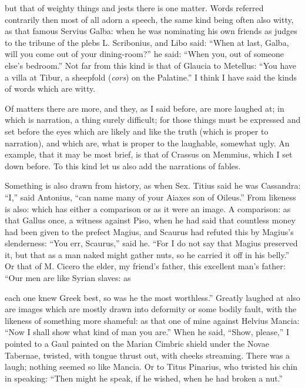  but that of weighty things and jests there is one matter. Words referred contrarily then most of all adorn a speech, the same kind being often also witty, as that famous Servius Galba: when he was nominating his own friends as judges to the tribune of the plebs L. Scribonius, and Libo said: ``When at last, Galba, will you come out of your dining-room?'' he said: ``When you, out of someone else's bedroom.'' Not far from this kind is that of Glaucia to Metellus: ``You have a villa at Tibur, a sheepfold (\textit{cors}) on the Palatine.'' I think I have said the kinds of words which are witty.

 Of matters there are more, and they, as I said before, are more laughed at; in which is narration, a thing surely difficult; for those things must be expressed and set before the eyes which are likely and like the truth (which is proper to narration), and which are, what is proper to the laughable, somewhat ugly. An example, that it may be most brief, is that of Crassus on Memmius, which I set down before. To this kind let us also add the narrations of fables.

 Something is also drawn from history, as when Sex. Titius said he was Cassandra: ``I,'' said Antonius, ``can name many of your Aiaxes son of Oileus.'' From likeness is also: which has either a comparison or as it were an image. A comparison: as that Gallus once, a witness against Piso, when he had said that countless money had been given to the prefect Magius, and Scaurus had refuted this by Magius's slenderness: ``You err, Scaurus,'' said he. ``For I do not say that Magius preserved it, but that as a man naked might gather nuts, so he carried it off in his belly.'' Or that of M. Cicero the elder, my friend's father, this excellent man's father: ``Our men are like Syrian slaves: as

 each one knew Greek best, so was he the most worthless.'' Greatly laughed at also are images which are mostly drawn into deformity or some bodily fault, with the likeness of something more shameful: as that one of mine against Helvius Mancia: ``Now I shall show what kind of man you are.'' When he said, ``Show, please,'' I pointed to a Gaul painted on the Marian Cimbric shield under the Novae Tabernae, twisted, with tongue thrust out, with cheeks streaming. There was a laugh; nothing seemed so like Mancia. Or to Titus Pinarius, who twisted his chin in speaking: ``Then might he speak, if he wished, when he had broken a nut.''


